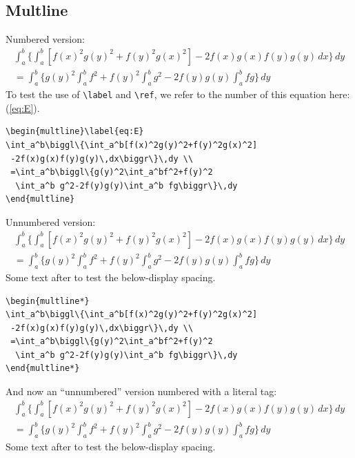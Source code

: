 \documentclass{article}
\theoremstyle{definition}
\theoremstyle{remark}
\begin{document}
\newpage
\subsection{Multline}
Numbered version:
\begin{multline}\label{eq:E}
\int_a^b\biggl\{\int_a^b[f(x)^2g(y)^2+f(y)^2g(x)^2]
 -2f(x)g(x)f(y)g(y)\,dx\biggr\}\,dy \\
 =\int_a^b\biggl\{g(y)^2\int_a^bf^2+f(y)^2
  \int_a^b g^2-2f(y)g(y)\int_a^b fg\biggr\}\,dy
\end{multline}
To test the use of \verb=\label= and
\verb=\ref=, we refer to the number of this
equation here: (\ref{eq:E}).

\begin{verbatim}
\begin{multline}\label{eq:E}
\int_a^b\biggl\{\int_a^b[f(x)^2g(y)^2+f(y)^2g(x)^2]
 -2f(x)g(x)f(y)g(y)\,dx\biggr\}\,dy \\
 =\int_a^b\biggl\{g(y)^2\int_a^bf^2+f(y)^2
  \int_a^b g^2-2f(y)g(y)\int_a^b fg\biggr\}\,dy
\end{multline}
\end{verbatim}

Unnumbered version:
\begin{multline*}
\int_a^b\biggl\{\int_a^b[f(x)^2g(y)^2+f(y)^2g(x)^2]
 -2f(x)g(x)f(y)g(y)\,dx\biggr\}\,dy \\
 =\int_a^b\biggl\{g(y)^2\int_a^bf^2+f(y)^2
  \int_a^b g^2-2f(y)g(y)\int_a^b fg\biggr\}\,dy
\end{multline*}
Some text after to test the below-display spacing.

\begin{verbatim}
\begin{multline*}
\int_a^b\biggl\{\int_a^b[f(x)^2g(y)^2+f(y)^2g(x)^2]
 -2f(x)g(x)f(y)g(y)\,dx\biggr\}\,dy \\
 =\int_a^b\biggl\{g(y)^2\int_a^bf^2+f(y)^2
  \int_a^b g^2-2f(y)g(y)\int_a^b fg\biggr\}\,dy
\end{multline*}
\end{verbatim}

\iffalse %
\newpage
And now an ``unnumbered'' version numbered with a literal tag:
\begin{multline*}\tag*{[a]}
\int_a^b\biggl\{\int_a^b[f(x)^2g(y)^2+f(y)^2g(x)^2]
 -2f(x)g(x)f(y)g(y)\,dx\biggr\}\,dy \\
 =\int_a^b\biggl\{g(y)^2\int_a^bf^2+f(y)^2
  \int_a^b g^2-2f(y)g(y)\int_a^b fg\biggr\}\,dy
\end{multline*}
Some text after to test the below-display spacing.
\end{document}
